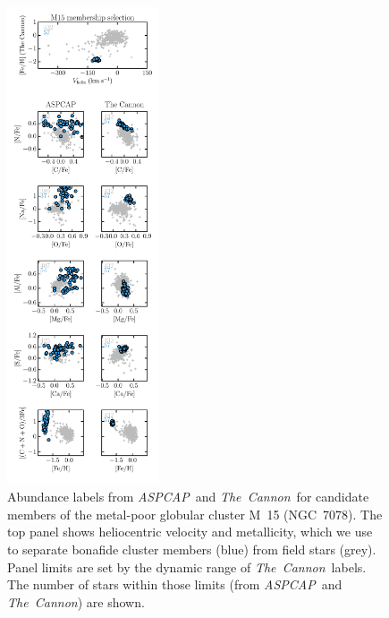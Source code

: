 \documentclass[12pt,preprint]{aastex}
\newcommand{\project}[1]{\textsl{#1}}
\newcommand{\TheCannon}{\project{The~Cannon}}
\newcommand{\acronym}[1]{{\small{#1}}}
\newcommand{\aspcap}{\project{\acronym{ASPCAP}}}
\begin{document}
\begin{figure}[p]
\centering
\includegraphics[width=0.40\textwidth]{M15_comparison.pdf}
\caption{Abundance labels from \aspcap\ and \TheCannon\ for candidate
members of the metal-poor globular cluster M~15 (NGC~7078).  The top panel
shows heliocentric velocity and metallicity, which we use to separate
bonafide cluster members (blue) from field stars (grey). Panel limits
are set by the dynamic range of \TheCannon\ labels.  The number of stars
within those limits (from \aspcap\ and \TheCannon) are shown.\label{fig:m15-comparison}}
\end{figure}

\clearpage
\end{document}
